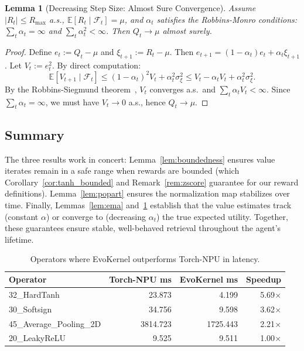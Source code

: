 \documentclass{article} %
\newcommand{\ourmethod}{EvoKernel\xspace}
\newtheorem{lemma}[theorem]{Lemma}
\theoremstyle{definition}
\theoremstyle{remark}
\begin{document}
  \begin{lemma}[Decreasing Step Size: Almost Sure Convergence]
  \label{lem:robbins}
  Assume $|R_t| \le R_{\max}$ a.s., $\mathbb{E}[R_t \mid \mathcal{F}_t] = \mu$, and $\alpha_t$ satisfies the Robbins-Monro conditions: $\sum_t \alpha_t = \infty$ and $\sum_t \alpha_t^2 < \infty$. Then $Q_t \to \mu$ almost surely.
  \end{lemma}

  \begin{proof}
  Define $e_t := Q_t - \mu$ and $\xi_{t+1} := R_t - \mu$. Then $e_{t+1} = (1-\alpha_t) e_t + \alpha_t \xi_{t+1}$. Let $V_t := e_t^2$. By direct computation:
  \[
  \mathbb{E}[V_{t+1} \mid \mathcal{F}_t] \le (1-\alpha_t)^2 V_t + \alpha_t^2 \sigma_\xi^2 \le V_t - \alpha_t V_t + \alpha_t^2 \sigma_\xi^2.
  \]
  By the Robbins-Siegmund theorem~\citep{robbins1971convergence}, $V_t$ converges a.s.\ and $\sum_t \alpha_t V_t < \infty$. Since $\sum_t \alpha_t = \infty$, we must have $V_t \to 0$ a.s., hence $Q_t \to \mu$.
  \end{proof}

  \subsection{Summary}

  The three results work in concert: Lemma~\ref{lem:boundedness} ensures value iterates remain in a safe range when rewards are bounded (which Corollary~\ref{cor:tanh_bounded} and Remark~\ref{rem:zscore} guarantee for our reward definitions). Lemma~\ref{lem:popart} ensures the normalization map stabilizes over time. Finally, Lemmas~\ref{lem:ema} and~\ref{lem:robbins} establish that the value estimates track (constant $\alpha$) or converge to (decreasing $\alpha_t$) the true expected utility. Together, these guarantees ensure stable, well-behaved retrieval throughout the agent's lifetime.

\begin{table}[h!]
\caption{Operators where \ourmethod outperforms Torch-NPU in latency.}
\label{tab:fast_ops}
\centering
\begin{tabular}{lrrr}
\toprule
Operator & Torch-NPU ms & \ourmethod ms & Speedup \\
\midrule
32\_HardTanh & 23.873 & 4.199 & 5.69$\times$ \\
30\_Softsign & 34.756 & 9.598 & 3.62$\times$ \\
45\_Average\_Pooling\_2D & 3814.723 & 1725.443 & 2.21$\times$ \\
20\_LeakyReLU & 9.525 & 9.511 & 1.00$\times$ \\
\bottomrule
\end{tabular}
\end{table}
\end{document}
